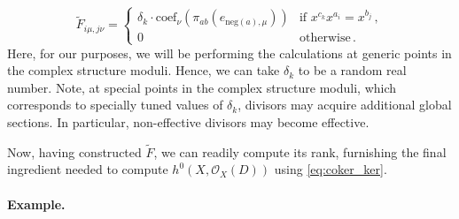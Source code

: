 \documentclass[11pt,dvipsnames]{article}
\theoremstyle{definition}
\newcommand{\cO}{\mathcal{O}}
\begin{document}
\begin{equation}
    \tilde{F}_{i\mu, j\nu} =
    \begin{cases}
        \delta_k \cdot \mathrm{coef}_\nu(\pi_{ab}(e_{\mathrm{neg}(a),\mu})) & \text{if } x^{c_k}x^{a_i} = x^{b_j} \,,\\
    0 &\text{otherwise}\,.
    \end{cases}
\end{equation}
Here, for our purposes, we will be performing the calculations at generic points in the complex structure moduli. Hence, we can take $\delta_k$ to be a random real number.
Note, at special points in the complex structure moduli, which corresponds to specially tuned values of $\delta_k$, divisors may acquire additional global sections. In particular, non-effective divisors may become effective.


Now, having constructed $\tilde{F}$, we can readily compute its rank, furnishing the final ingredient needed to compute $h^0(X,\cO_X(D))$ using \cref{eq:coker_ker}.

\paragraph{Example.}
\end{document}
